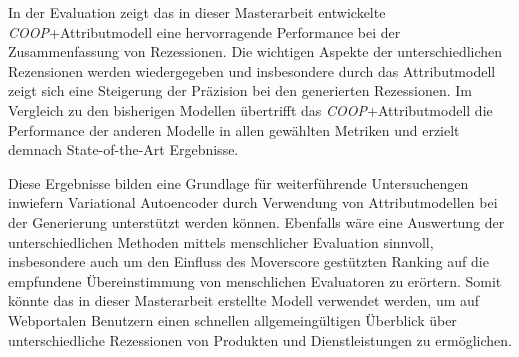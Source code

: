 In der Evaluation zeigt das in dieser Masterarbeit entwickelte \textit{COOP}+Attributmodell eine hervorragende Performance bei der Zusammenfassung von Rezessionen. 
Die wichtigen Aspekte der unterschiedlichen Rezensionen werden wiedergegeben und insbesondere durch das Attributmodell zeigt sich eine Steigerung der Präzision bei den generierten Rezessionen. 
Im Vergleich zu den bisherigen Modellen übertrifft das \textit{COOP}+Attributmodell die Performance der anderen Modelle in allen gewählten Metriken und erzielt demnach State-of-the-Art Ergebnisse.

Diese Ergebnisse bilden eine Grundlage für weiterführende Untersuchengen inwiefern Variational Autoencoder durch Verwendung von Attributmodellen bei der Generierung unterstützt werden können.
Ebenfalls wäre eine Auswertung der unterschiedlichen Methoden mittels menschlicher Evaluation sinnvoll, insbesondere auch um den Einfluss des Moverscore gestützten Ranking auf die empfundene Übereinstimmung von menschlichen Evaluatoren zu erörtern.
Somit könnte das in dieser Masterarbeit erstellte Modell verwendet werden, um auf Webportalen Benutzern einen schnellen allgemeingültigen Überblick über unterschiedliche Rezessionen von Produkten und Dienstleistungen zu ermöglichen.



\pagebreak
